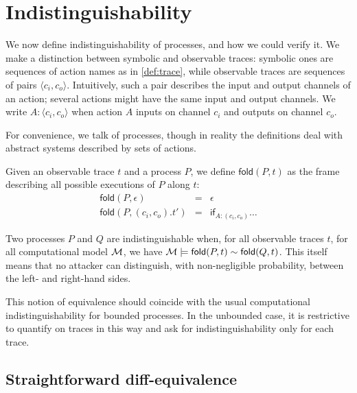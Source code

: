 \section{Indistinguishability}

\newcommand{\pair}[1]{\langle #1 \rangle}

We now define indistinguishability of processes, and how we could verify it.
We make a distinction between symbolic and observable traces:
symbolic ones are sequences of action names as in \cref{def:trace},
while observable traces are sequences of pairs $\pair{c_i,c_o}$.
Intuitively, such a pair describes the input and output channels of an
action; several actions might have the same input and output channels.
We write $A : \pair{c_i,c_o}$ when action $A$ inputs on channel $c_i$ and
outputs on channel $c_o$.

For convenience, we talk of processes, though in reality the definitions
deal with abstract systems described by sets of actions.

\newcommand{\fold}{\mathsf{fold}}

\begin{definition}
  Given an observable trace $t$ and a process $P$,
  we define $\fold(P,t)$ as the frame describing all possible
  executions of $P$ along $t$:
  \begin{eqnarray*}
    \fold(P,\epsilon) &=& \epsilon \\
    \fold(P,(c_i,c_o).t') &=&
      \mathsf{if}_{A:(c_i,c_o)}
      \ldots
  \end{eqnarray*}
\end{definition}

\begin{definition}
  Two processes $P$ and $Q$ are indistinguishable when,
  for all observable traces $t$,
  for all computational model $\mathcal{M}$,
  we have
  $\M \models \fold(P,t) \sim \fold(Q,t)$.
  This itself means that no attacker can distinguish,
  with non-negligible probability, between the left- and right-hand sides.
\end{definition}

This notion of equivalence should coincide with the usual computational
indistinguishability for bounded processes. In the unbounded case, it
is restrictive to quantify on traces in this way
and ask for indistinguishability only for each trace.

\subsection{Straightforward diff-equivalence}

